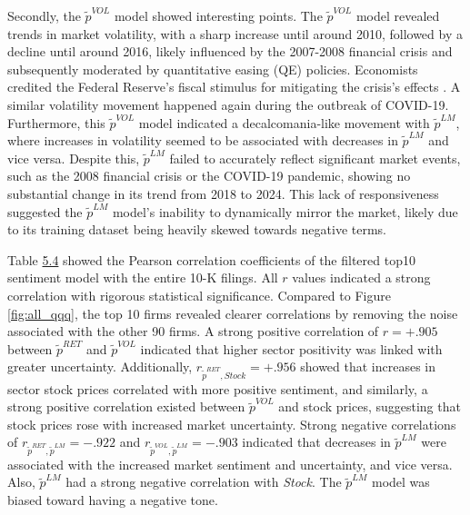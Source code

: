 \documentclass[logo,bsc,singlespacing,parskip]{infthesis}
\begin{document}
Secondly, the $\tilde{p}^{VOL}$ model showed interesting points. The $\tilde{p}^{VOL}$ model revealed trends in market volatility, with a sharp increase until around 2010, followed by a decline until around 2016, likely influenced by the 2007-2008 financial crisis and subsequently moderated by quantitative easing (QE) policies. Economists credited the Federal Reserve's fiscal stimulus for mitigating the crisis's effects \cite{Gagnon2010, Chen2011, Stein2012, Gilchrist2013, Curdia2013, Wang2019, Luck2019}. A similar volatility movement happened again during the outbreak of COVID-19. Furthermore, this $\tilde{p}^{VOL}$ model indicated a decalcomania-like movement with $\tilde{p}^{LM}$, where increases in volatility seemed to be associated with decreases in $\tilde{p}^{LM}$ and vice versa. Despite this, $\tilde{p}^{LM}$ failed to accurately reflect significant market events, such as the 2008 financial crisis or the COVID-19 pandemic, showing no substantial change in its trend from 2018 to 2024. This lack of responsiveness suggested the $\tilde{p}^{LM}$ model's inability to dynamically mirror the market, likely due to its training dataset being heavily skewed towards negative terms.

Table \hyperref[tab:all_top10_corr]{5.4} showed the Pearson correlation coefficients of the filtered top10 sentiment model with the entire 10-K filings. All $r$ values indicated a strong correlation with rigorous statistical significance. Compared to Figure \ref{fig:all_qqq}, the top 10 firms revealed clearer correlations by removing the noise associated with the other 90 firms. A strong positive correlation of $r=+.905$ between $\tilde{p}^{RET}$ and $\tilde{p}^{VOL}$ indicated that higher sector positivity was linked with greater uncertainty. Additionally, $r_{\tilde{p}^{RET}, Stock}=+.956$ showed that increases in sector stock prices correlated with more positive sentiment, and similarly, a strong positive correlation existed between $\tilde{p}^{VOL}$ and stock prices, suggesting that stock prices rose with increased market uncertainty. Strong negative correlations of $r_{\tilde{p}^{RET},\tilde{p}^{LM}}=-.922$ and $r_{\tilde{p}^{VOL},\tilde{p}^{LM}}=-.903$ indicated that decreases in $\tilde{p}^{LM}$ were associated with the increased market sentiment and uncertainty, and vice versa. Also, $\tilde{p}^{LM}$ had a strong negative correlation with \textit{Stock}. The $\tilde{p}^{LM}$ model was biased toward having a negative tone.  


\end{document}
